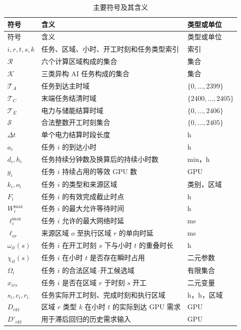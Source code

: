 \documentclass[withoutpreface,bwprint]{cumcmthesis}
\begin{document}
{\scriptsize
\renewcommand{\arraystretch}{0.88}
\setlength{\tabcolsep}{3pt}
\begin{longtable}{lll}
\caption{主要符号及其含义}
\label{tab:symbols}\\
\toprule
符号 & 含义 & 类型或单位 \\
\midrule
\endfirsthead
\toprule
符号 & 含义 & 类型或单位 \\
\midrule
\endhead
\bottomrule
\endfoot
$i,r,t,s,k$ & 任务、区域、小时、开工时刻和任务类型索引 & 索引 \\
$\mathcal R$ & 六个计算区域构成的集合 & 集合 \\
$\mathcal K$ & 三类异构 AI 任务构成的集合 & 集合 \\
$\mathcal T_A$ & 任务到达主时域 & $\{0,\ldots,2399\}$ \\
$\mathcal T_C$ & 末端任务结清时域 & $\{2400,\ldots,2405\}$ \\
$\mathcal T_E$ & 电力与储能结算时域 & $\{0,\ldots,2406\}$ \\
$\mathcal S$ & 合法整数开工时刻集合 & $\{0,\ldots,2405\}$ \\
$\Delta t$ & 单个电力结算时段长度 & h \\
$a_i$ & 任务 $i$ 的到达小时 & h \\
$d_i,h_i$ & 任务持续分钟数及换算后的持续小时数 & min，h \\
$g_i$ & 任务 $i$ 持续占用的等效 GPU 数 & GPU \\
$k_i,o_i$ & 任务 $i$ 的类型和来源区域 & 类别，区域 \\
$F_i$ & 任务 $i$ 的有效完成截止时点 & h \\
$W_i^{\max}$ & 任务 $i$ 的最大允许等待时间 & h \\
$\ell_i^{\max}$ & 任务 $i$ 允许的最大网络时延 & ms \\
$\ell_{or}$ & 来源区域 $o$ 至执行区域 $r$ 的单向时延 & ms \\
$\omega_{it}(s)$ & 任务 $i$ 在开工时刻 $s$ 下与小时 $t$ 的重叠时长 & h \\
$\chi_{it}(s)$ & 任务 $i$ 在小时 $t$ 是否存在瞬时占用 & 二元参数 \\
$\Omega_i$ & 任务 $i$ 的合法区域--开工候选域 & 有限集合 \\
$x_{irs}$ & 任务 $i$ 是否在区域 $r$ 于时刻 $s$ 开工 & 二元变量 \\
$s_i,c_i,r_i$ & 任务实际开工时刻、完成时刻和执行区域 & h，h，区域 \\
$D_{rkt}$ & 区域 $r$ 类型 $k$ 在小时 $t$ 的实际到达 GPU 需求 & GPU \\
$D'_{rkt}$ & 用于滞后回归的历史需求输入 & GPU \\

\end{longtable}}
\end{document}
